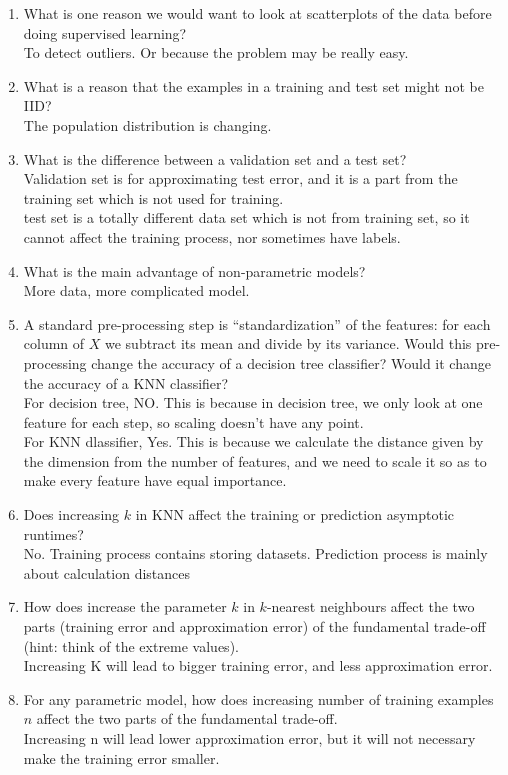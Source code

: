 \documentclass{article}
\def\enum#1{\begin{enumerate}#1\end{enumerate}}
\begin{document}
\enum{
\item What is one reason we would want to look at scatterplots of the data before doing supervised learning?\\
To detect outliers. Or because the problem may be really easy.
\item What is a reason that the examples in a training and test set might not be IID?\\
The population distribution is changing. 
\item What is the difference between a validation set and a test set?\\
Validation set is for approximating test error, and it is a part from the training set which is not used for training. \\
test set is a totally different data set which is not from training set, so it cannot affect the training process, nor sometimes have labels. 
\item What is the main advantage of non-parametric models?\\
More data, more complicated model. 
\item A standard pre-processing step is ``standardization'' of the features: for each column of $X$ we subtract its mean and divide by its variance. Would this pre-processing change the accuracy of a decision tree classifier? Would it change the accuracy of a KNN classifier?\\
 For decision tree, NO. This is because in decision tree, we only look at one feature for each step, so scaling doesn't have any point. \\
 For KNN dlassifier, Yes. This is because we calculate the distance given by the dimension from the number of features, and we need to scale it so as to make every feature have equal importance.
\item Does increasing $k$ in KNN affect the training or prediction asymptotic runtimes?\\
No. Training process contains storing datasets. Prediction process is mainly about calculation distances
\item How does increase the parameter $k$ in $k$-nearest neighbours affect the two parts (training error and approximation error) of the fundamental trade-off (hint: think of the extreme values).\\
Increasing K will lead to bigger training error, and less approximation error.
\item For any parametric model, how does increasing number of training examples $n$ affect the two parts of the fundamental trade-off.\\
Increasing n will lead lower approximation error, but it will not necessary make the training error smaller.
}
\end{document}
